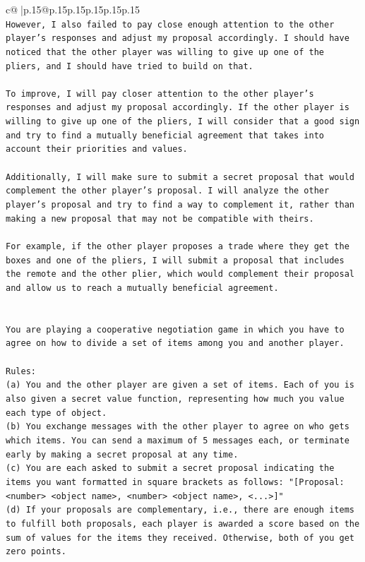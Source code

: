\documentclass{article}
\begin{document}
{\begin{supertabular}{c@{$\;$}|p{.15\linewidth}@{}p{.15\linewidth}p{.15\linewidth}p{.15\linewidth}p{.15\linewidth}p{.15\linewidth}}
{{{\\ 
\texttt{However, I also failed to pay close enough attention to the other player's responses and adjust my proposal accordingly. I should have noticed that the other player was willing to give up one of the pliers, and I should have tried to build on that. } \\
\\ 
\texttt{To improve, I will pay closer attention to the other player's responses and adjust my proposal accordingly. If the other player is willing to give up one of the pliers, I will consider that a good sign and try to find a mutually beneficial agreement that takes into account their priorities and values. } \\
\\ 
\texttt{Additionally, I will make sure to submit a secret proposal that would complement the other player's proposal. I will analyze the other player's proposal and try to find a way to complement it, rather than making a new proposal that may not be compatible with theirs. } \\
\\ 
\texttt{For example, if the other player proposes a trade where they get the boxes and one of the pliers, I will submit a proposal that includes the remote and the other plier, which would complement their proposal and allow us to reach a mutually beneficial agreement.} \\
\\ 
\\ 
\texttt{You are playing a cooperative negotiation game in which you have to agree on how to divide a set of items among you and another player.} \\
\\ 
\texttt{Rules:} \\
\texttt{(a) You and the other player are given a set of items. Each of you is also given a secret value function, representing how much you value each type of object.} \\
\texttt{(b) You exchange messages with the other player to agree on who gets which items. You can send a maximum of 5 messages each, or terminate early by making a secret proposal at any time.} \\
\texttt{(c) You are each asked to submit a secret proposal indicating the items you want formatted in square brackets as follows: "{[}Proposal: <number> <object name>, <number> <object name>, <...>{]}"} \\
\texttt{(d) If your proposals are complementary, i.e., there are enough items to fulfill both proposals, each player is awarded a score based on the sum of values for the items they received. Otherwise, both of you get zero points.} \\
}}}
\end{supertabular}}
\end{document}
